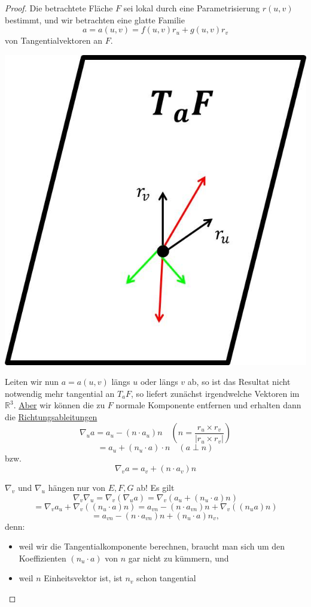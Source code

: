 \documentclass[a4paper,11pt,notitlepage]{report}
\theoremstyle{definition}
\newcommand{\R}{{\ensuremath{\mathbb{R}}}}
\begin{document}
\begin{proof}
	Die betrachtete Fläche $F$ sei lokal durch eine Parametrisierung $r(u,v)$ bestimmt, und wir betrachten eine glatte Familie $$a = a(u,v) = f(u,v) r_u + g(u,v) r_v$$
	von Tangentialvektoren an $F$.
\begin{center}
	\includegraphics[scale=0.3]{images/2012_01_31_Bild3.jpg}
\end{center}
	Leiten wir nun $a = a(u,v)$ längs $u$ oder längs $v$ ab, so ist das Resultat nicht notwendig mehr tangential an $T_aF$, so liefert zunächst irgendwelche Vektoren im $\R^3$. \underline{Aber} wir können die zu $F$ normale Komponente entfernen und erhalten dann die \underline{Richtungsableitungen} 
	$$\nabla_u a = a_u - (n \cdot a_u) n \quad (n = \frac{r_u \times r_v}{|r_u \times r_v|})$$
	$$= a_u + (n_u \cdot a) \cdot n \quad (a \perp n)$$
	bzw.
	$$\nabla_v a = a_v + (n \cdot a_v) n$$ 
	
	$\nabla_v$ und $\nabla_u$ hängen nur von $E,F,G$ ab!
	Es gilt
	$$\nabla_v \nabla_u = \nabla_v (\nabla_u a) = \nabla_v (a_u + (n_u \cdot a) n)$$
	$$= \nabla_v a_u + \nabla_v((n_u \cdot a) n) = a_{vn} - (n \cdot a_{vn}) n + \nabla_v((n_u a) n)$$
	$$= a_{vn} - (n \cdot a_{vn}) n + (n_u \cdot a) n_v,$$
	denn:
	\begin{itemize}
		\item weil wir die Tangentialkomponente berechnen, braucht man sich um den Koeffizienten $(n_u \cdot a)$ von $n$ gar nicht zu kümmern, und 
		\item weil $n$ Einheitsvektor ist, ist $n_v$ schon tangential
	\end{itemize}
	

\end{proof}
\end{document}
